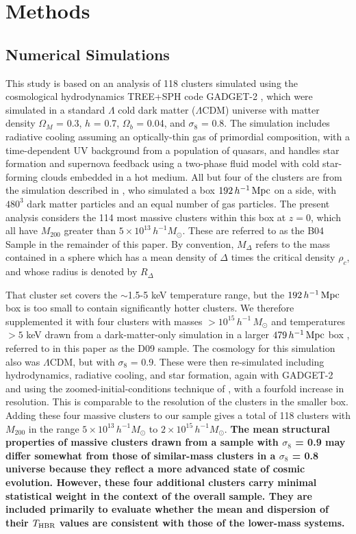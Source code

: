 \documentclass[12pt,preprint]{aastex}
\begin{document}
\section{Methods}

\subsection{Numerical Simulations}
This study is based on an analysis of 118 clusters simulated using the
cosmological hydrodynamics TREE+SPH code GADGET-2
\citep{springel_cosmological_2005}, which were simulated in a standard
$\Lambda$ cold dark matter ($\Lambda$CDM) universe with matter density
$\Omega_M$ = 0.3, $h$ = 0.7, $\Omega_b$ = 0.04, and $\sigma_8$ = 0.8.
The simulation includes radiative cooling assuming an optically-thin
gas of primordial composition, with a time-dependent UV background
from a population of quasars, and handles star formation and supernova
feedback using a two-phase fluid model with cold star-forming clouds
embedded in a hot medium.  All but four of the clusters are from the
simulation described in \cite{borgani_hydrodynamical_2004}, who
simulated a box $192 \, h^{-1} \, {\rm Mpc}$ on a side, with $480^3$
dark matter particles and an equal number of gas particles.  The
present analysis considers the 114 most massive clusters within this
box at $z = 0$, which all have $M_{200}$ greater than $5 \times
10^{13} \, h^{-1} M_\odot$.  These are referred to as the B04 Sample
in the remainder of this paper.  By convention, $M_{\Delta}$ refers to
the mass contained in a sphere which has a mean density of $\Delta$
times the critical density $\rho_c$, and whose radius is denoted by
$R_{\Delta}$

That cluster set covers the $\sim$1.5-5 keV temperature range, but the
$192 \, h^{-1} \, {\rm Mpc}$ box is too small to contain significantly
hotter clusters.  We therefore supplemented it with four clusters with
masses $> 10^{15} \, h^{-1} \, M_\odot$ and temperatures $> 5$ keV
drawn from a dark-matter-only simulation in a larger $479 \, h^{-1} \,
{\rm Mpc}$ box \citep{2009MNRAS.398.1678D}, referred to in this paper
as the D09 sample.  The cosmology for this simulation also was
$\Lambda$CDM, but with $\sigma_8$ = 0.9.  These were then re-simulated
including hydrodynamics, radiative cooling, and star formation, again
with GADGET-2 and using the zoomed-initial-conditions technique of
\cite{tormen_rise_1997}, with a fourfold increase in resolution.  This
is comparable to the resolution of the clusters in the smaller box.
Adding these four massive clusters to our sample gives a total of 118
clusters with $M_{200}$ in the range $5 \times 10^{13} \, h^{-1}
M_\odot$ to $2 \times 10^{15} \, h^{-1} M_\odot$.
{\bf The mean structural properties of massive clusters drawn from a sample with $\sigma_8$ = 0.9 may differ somewhat from those of similar-mass clusters in a $\sigma_8$ = 0.8 universe because they reflect a more advanced state of cosmic evolution.  However, these four additional clusters carry minimal statistical weight in the context of the overall sample.  They are included primarily to evaluate whether the mean and dispersion of their $T_{\rm HBR}$ values are consistent with those of the lower-mass systems.}
\end{document}
